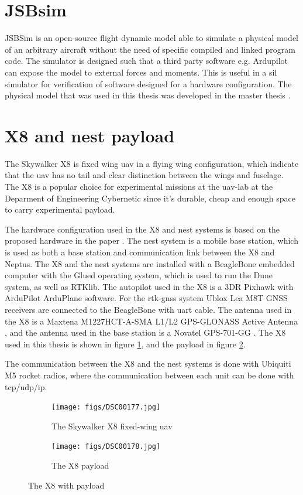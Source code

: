 \section{JSBsim}
JSBSim \citep{berndt2004jsbsim} is an open-source flight dynamic model able to simulate a physical model of an arbitrary aircraft without the need of specific compiled and linked program code. The simulator is designed such that a third party software e.g. Ardupilot can expose the model to external forces and moments. This is useful in a \gls{sil} simulator for verification of software designed for a hardware configuration. The physical model that was used in this thesis was developed in the master thesis \citep{Gryte}.
\section{X8 and nest payload}\label{ss:X8andNest}
The Skywalker X8 is fixed wing \gls{uav} in a flying wing configuration, which indicate that the \gls{uav} has no tail and clear distinction between the wings and fuselage. The X8 is a popular choice for experimental missions at the \gls{uav}-lab at the Deparment of Engineering Cybernetic since it's durable, cheap and enough space to carry experimental payload.

The hardware configuration used in the X8 and nest systems is based on the proposed hardware in the paper \citep{zolich2015unmanned}. The nest system is a mobile base station, which is used as both a base station and communication link between the X8 and Neptus. The X8 and the nest systems are installed with a BeagleBone embedded computer with the Glued operating system, which is used to run the Dune system, as well as RTKlib. The autopilot used in the X8 is a 3DR Pixhawk with ArduPilot ArduPlane software. For the \gls{rtk-gnss} system Ublox Lea M8T GNSS receivers \citep{UbloxDataSheet,UbloxReceiverDescription} are connected to the BeagleBone with uart cable. The antenna used in the X8 is a Maxtena M1227HCT-A-SMA L1/L2 GPS-GLONASS Active Antenna \citep{maxtena}, and the antenna used in the base station is a Novatel GPS-701-GG \citep{novatel}. The X8 used in this thesis is shown in figure \ref{Fig:X8}, and the payload in figure \ref{Fig:X8Payload}.

The communication between the X8 and the nest systems is done with Ubiquiti M5 rocket \citep{rocketM5} radios, where the communication between each unit can be done with \gls{tcp}/\gls{udp}/\gls{ip}.
\begin{figure}[H]
\centering
\begin{subfigure}{0.45\textwidth}
		\texttt{[image: figs/DSC00177.jpg]}
\caption{The Skywalker X8 fixed-wing \gls{uav}}
\label{Fig:X8}
\end{subfigure}
\begin{subfigure}{0.45\textwidth}
		\texttt{[image: figs/DSC00178.jpg]}
		\caption{The X8 payload}
		\label{Fig:X8Payload}
\end{subfigure}
\caption{The X8 with payload}
\label{Fig:X8withPayload}
\end{figure}
\cleardoublepage